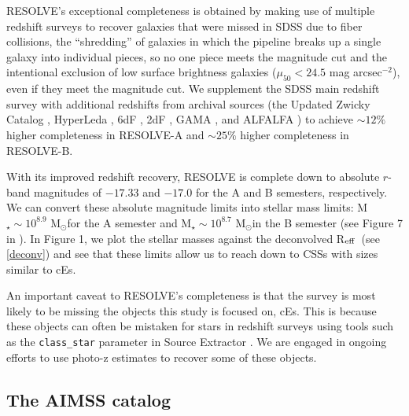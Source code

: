 \documentclass[iop,apj]{emulateapj}
\newcommand{\Reff}{R$_{\rm eff}$}
\newcommand{\Msun}{M$_{\odot}$}
\begin{document}
RESOLVE's exceptional completeness is obtained by making use of multiple redshift surveys to recover galaxies that were missed in SDSS due to fiber collisions, the ``shredding'' of galaxies in which the pipeline breaks up a single galaxy into individual pieces, so no one piece meets the magnitude cut and the intentional exclusion of low surface brightness galaxies ($\mu_{50} < 24.5$ mag arcsec$^{-2}$), even if they meet the magnitude cut. We supplement the SDSS main redshift survey with additional redshifts from archival sources (the Updated Zwicky Catalog \citep{Falco1999}, HyperLeda \citep{Paturel2003}, 6dF \citep{Jones2009}, 2dF \citep{Colless2001}, GAMA \citep{Driver2011}, and ALFALFA \citep{Haynes2011}) to achieve $\sim12\%$ higher completeness in RESOLVE-A and $\sim25\%$ higher completeness in RESOLVE-B.

With its improved redshift recovery, RESOLVE is complete down to absolute $r$-band magnitudes of $-17.33$ and $-17.0$ for the A and B semesters, respectively. We can convert these absolute magnitude limits into stellar mass limits: M$_{\star} \sim 10^{8.9}$ \Msun for the A semester and M$_{\star} \sim 10^{8.7}$ \Msun in the B semester (see Figure 7 in \citet{Eckert2016}). In Figure 1, we plot the stellar masses against the deconvolved \Reff\ (see \autoref{deconv}) and see that these limits allow us to reach down to CSSs with sizes similar to cEs.

An important caveat to RESOLVE's completeness is that the survey is most likely to be missing the objects this study is focused on, cEs. This is because these objects can often be mistaken for stars in redshift surveys using tools such as the \texttt{class\_star} parameter in Source Extractor \citep{Bertin1996}. We are engaged in ongoing efforts to use photo-z estimates to recover some of these objects.

\subsection{The AIMSS catalog}
\label{aimss}
\end{document}
